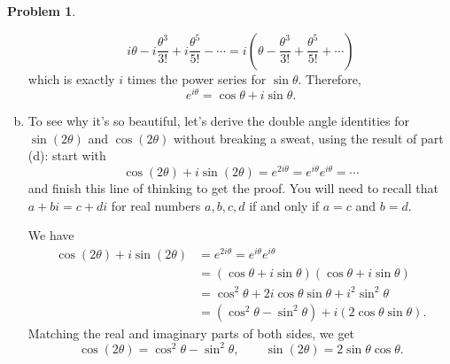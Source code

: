 \documentclass[11pt,oneside]{amsart}
\theoremstyle{definition}
\newtheorem{problem}{Problem}
\theoremstyle{plain}
\begin{document}
\begin{problem}
\begin{enumerate}[(a)]
\begin{solution}
          \[i\theta-i\frac{\theta^3}{3!}+i\frac{\theta^5}{5!}-\cdots=i\left(\theta-\frac{\theta^3}{3!}+\frac{\theta^5}{5!}+\cdots\right)\]
          which is exactly $i$ times the power series for $\sin\theta$. Therefore,
          \[e^{i\theta}=\cos\theta+i\sin\theta.\]
        \end{solution}
  \item To see why it's so beautiful, let's derive the double angle identities for $\sin(2\theta)$ and $\cos(2\theta)$ without breaking a sweat, using the result of part (d): start with
        \[\cos(2\theta)+i\sin(2\theta)=e^{2i\theta}=e^{i\theta}e^{i\theta}=\cdots\]
        and finish this line of thinking to get the proof. You will need to recall that $a+bi=c+di$ for real numbers $a,b,c,d$ if and only if $a=c$ and $b=d$.
        \begin{solution}
          We have
          \[\begin{split}
              \cos(2\theta)+i\sin(2\theta) &= e^{2i\theta}=e^{i\theta}e^{i\theta}\\
              &= (\cos\theta+i\sin\theta)(\cos\theta+i\sin\theta)\\
              &= \cos^2\theta+2i\cos\theta\sin\theta+i^2\sin^2\theta\\
              &= (\cos^2\theta-\sin^2\theta)+i(2\cos\theta\sin\theta).
            \end{split}\]
          Matching the real and imaginary parts of both sides, we get
          \[\cos(2\theta)=\cos^2\theta-\sin^2\theta,\qquad\sin(2\theta)=2\sin\theta\cos\theta.\]
        \end{solution}
\end{enumerate}
\end{problem}
\end{document}
